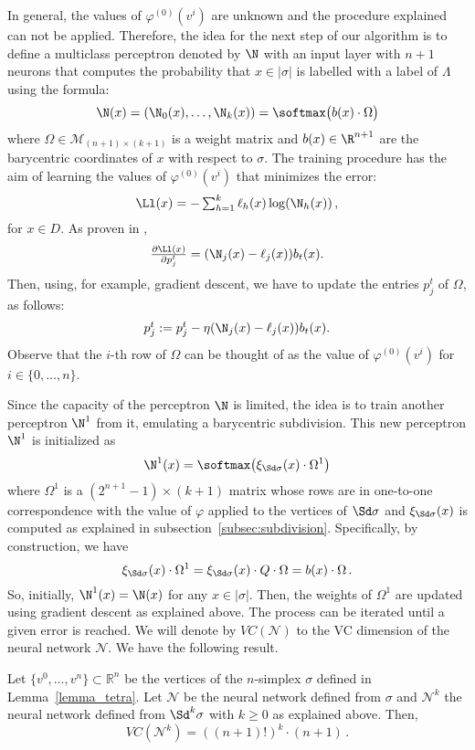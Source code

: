 In general, the values of  $\varphi^{\scriptscriptstyle (0)}(v^i)$ are unknown and the procedure explained can not be applied. 
Therefore, the idea for the 
next step of our algorithm is  to  define   a multiclass perceptron denoted by $\N$ with an input layer with $n+1$ neurons that computes the probability that  $x\in|\sigma|$ is labelled with a label of $\Lambda$
using the formula:
$$\N(x)=(\N_0(x),\dots, \N_k(x))=
\softmax\big(b(x)\cdot \Omega \big)
$$
where $\Omega\in \mathcal{M}_{(n+1)\times (k+1)}$
is a weight matrix
and $b(x)\in \R^{n+1}$ are the barycentric coordinates of $x$ with respect to $\sigma$.
The training procedure has the aim of learning the values of  $\varphi^{\scriptscriptstyle (0)}(v^i)$  that minimizes the error:
\[\mbox{$\Ll(x)=-\sum_{ h=1}^k\ell_h(x)\log(\N_h(x))$}\,,\]
 for $x\in D$.
As proven in \cite{paluzohidalgo2023explainability}, 
$$\mbox{$\frac{\partial\Ll(x)}{\partial p_j^{t}}=(\N_j(x)-\ell_j(x))b_{t}(x).$}$$
Then, using, for example, gradient descent, we have to update the entries $p_j^{t}$ of $\Omega$, as follows:
\[\mbox{$p_j^{t}:=
p_j^{t}-\eta(\N_j(x)-\ell_j(x))b_{t}(x)$.}\]
Observe that the $i$-th row of $\Omega$ can be thought of as the value of
$\varphi^{(0)}(v^i)$ for $i\in \{0,\dots ,n\}$.

Since the capacity of the perceptron $\N$ is limited, the idea is to train another perceptron $\N^1$ from it, emulating a barycentric subdivision.
This new perceptron $\N^1$ is initialized as
$$\N^1(x)=\softmax\big(
\xi_{\Sd \sigma}(x)
\cdot \Omega^1 \big)$$
where $\Omega^1$
is a $(2^{n+1}-1)\times(k+1)$ matrix whose rows are in one-to-one correspondence with the value of  
$\varphi$ applied to the vertices of $\Sd\sigma$ and
$
\xi_{\Sd \sigma}(x)
$ is computed as explained in subsection~\ref{subsec:subdivision}.
Specifically, by construction, we have 
$$\xi_{\Sd \sigma}(x)
\cdot \Omega^1  =
\xi_{\Sd \sigma}(x)
\cdot Q\cdot \Omega=b(x)\cdot\Omega\,.$$   So, initially, 
$\N^1(x)=\N(x)$ for any $x\in |\sigma|$. 
Then, the weights of $\Omega^1$ are updated using gradient descent as explained above.
The process can be iterated until a given error is reached. We will denote by $VC(\mathcal{N})$ to the VC dimension of the neural network $\mathcal{N}$. We have the following result.

\begin{theorem}
Let $\{v^0,\dots,v^n\}\subset\mathbb{R}^n$ be the vertices of the $n$-simplex $\sigma$ defined in Lemma~\ref{lemma_tetra}. Let $\mathcal{N}$ be the neural network
defined from $\sigma$ and $\mathcal{N}^k$ the neural network
defined from $\Sd^k \sigma$ with $k\ge 0$ as explained above.
Then,
 $$VC(\mathcal{N}^k)= ((n+1)!)^k\cdot (n+1)\,.$$
\end{theorem}

